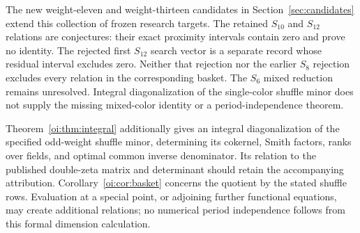 The new weight-eleven and weight-thirteen candidates in
Section~\ref{sec:candidates} extend this collection of frozen research
targets. The retained $S_{10}$ and $S_{12}$ relations are conjectures:
their exact proximity intervals contain zero and prove no identity.
The rejected first $S_{12}$ search vector is a separate record whose
residual interval excludes zero. Neither that rejection nor the earlier
$S_8$ rejection excludes every relation in the corresponding basket.
The $S_6$ mixed reduction remains unresolved. Integral diagonalization
of the single-color shuffle minor does not supply the missing
mixed-color identity or a period-independence theorem.

Theorem~\ref{oi:thm:integral} additionally gives an integral
diagonalization of the specified odd-weight shuffle minor, determining
its cokernel, Smith factors, ranks over fields, and optimal common
inverse denominator. Its relation to the published double-zeta matrix
and determinant should retain the accompanying attribution.
Corollary~\ref{oi:cor:basket} concerns the quotient by the stated shuffle
rows. Evaluation at a special point, or adjoining further functional
equations, may create additional relations; no numerical period
independence follows from this formal dimension calculation.
